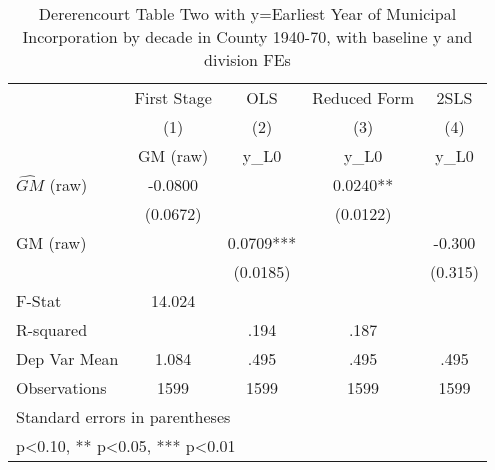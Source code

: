 \begin{table}[htbp]\centering
\def\sym#1{\ifmmode^{#1}\else\(^{#1}\)\fi}
\caption{Dererencourt Table Two with y=Earliest Year of Municipal Incorporation by decade in County 1940-70, with baseline y and division FEs}
\begin{tabular}{l*{4}{c}}
\toprule
                    & First Stage   &         OLS   &Reduced Form   &        2SLS   \\
                    &\multicolumn{1}{c}{(1)}&\multicolumn{1}{c}{(2)}&\multicolumn{1}{c}{(3)}&\multicolumn{1}{c}{(4)}\\
                    &\multicolumn{1}{c}{GM  (raw)}&\multicolumn{1}{c}{y\_L0}&\multicolumn{1}{c}{y\_L0}&\multicolumn{1}{c}{y\_L0}\\
\midrule
$\hat{GM}$ (raw)    &     -0.0800   &               &      0.0240** &               \\
                    &    (0.0672)   &               &    (0.0122)   &               \\
\addlinespace
GM  (raw)           &               &      0.0709***&               &      -0.300   \\
                    &               &    (0.0185)   &               &     (0.315)   \\
\midrule
F-Stat              &      14.024   &               &               &               \\
R-squared           &               &        .194   &        .187   &               \\
Dep Var Mean        &       1.084   &        .495   &        .495   &        .495   \\
Observations        &        1599   &        1599   &        1599   &        1599   \\
\bottomrule
\multicolumn{5}{l}{\footnotesize Standard errors in parentheses}\\
\multicolumn{5}{l}{\footnotesize * p<0.10, ** p<0.05, *** p<0.01}\\
\end{tabular}
\end{table}
